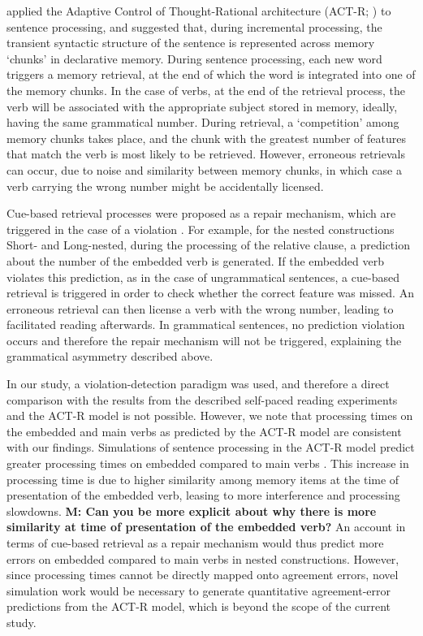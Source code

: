 \citet{lewis2005activation} applied the Adaptive Control of Thought-Rational architecture (ACT-R; \citet{anderson2013architecture}) to sentence processing, and suggested that, during incremental processing, the transient syntactic structure of the sentence is represented across memory `chunks’ in declarative memory. During sentence processing, each new word triggers a memory retrieval, at the end of which the word is integrated into one of the memory chunks. In the case of verbs, at the end of the retrieval process, the verb will be associated with the appropriate subject stored in memory, ideally, having the same grammatical number. During retrieval, a `competition' among memory chunks takes place, and the chunk with the greatest number of features that match the verb is most likely to be retrieved. However, erroneous retrievals can occur, due to  noise and similarity between memory chunks, in which case a verb carrying the wrong number might be accidentally licensed. 

Cue-based retrieval processes were proposed as a repair mechanism, which are triggered in the case of a violation \citep{wagers2009agreement, lago2015agreement}. For example, for the nested constructions Short- and Long-nested, during the processing of the relative clause, a prediction about the number of the embedded verb is generated. If the embedded verb violates this prediction, as in the case of ungrammatical sentences, a cue-based retrieval is triggered in order to check whether the correct feature was missed. An erroneous retrieval can then license a verb with the wrong number, leading to facilitated reading afterwards. In grammatical sentences, no prediction violation occurs and therefore the repair mechanism will not be triggered, explaining the grammatical asymmetry described above. 

In our study, a violation-detection paradigm was used, and therefore a direct comparison with the results from the described self-paced reading experiments and the ACT-R model is not possible. However, we note that processing times on the embedded and main verbs as predicted by the ACT-R model are consistent with our findings. Simulations of sentence processing in the ACT-R model predict greater processing times on embedded compared to main verbs \citep{lewis2005activation}. This increase in processing time is due to higher similarity among memory items at the time of presentation of the embedded verb, leasing to more interference and processing slowdowns. \textbf{M: Can you be more explicit about why there is more similarity at time of presentation of the embedded verb?} An account in terms of cue-based retrieval as a repair mechanism would thus predict more errors on embedded compared to main verbs in nested constructions.  However, since processing times cannot be directly mapped onto agreement errors, novel simulation work would be necessary to generate quantitative agreement-error predictions from the ACT-R model, which is beyond the scope of the current study.

